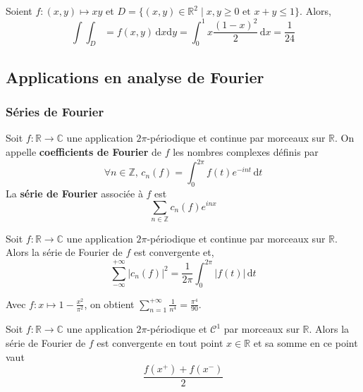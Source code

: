 
  \begin{example}
    Soient $f : (x,y) \mapsto xy$ et $D = \{ (x,y) \in \mathbb{R}^2 \mid x, y \geq 0 \text{ et } x + y \leq 1 \}$. Alors,
    \[ \int \int_D = f(x,y) \, \mathrm{d}x \mathrm{d}y = \int_0^1 x \frac{(1-x)^2}{2} \, \mathrm{d}x = \frac{1}{24} \]
  \end{example}

  \subsection{Applications en analyse de Fourier}

  \subsubsection{Séries de Fourier}


  \begin{definition}
    Soit $f : \mathbb{R} \rightarrow \mathbb{C}$ une application $2\pi$-périodique et continue par morceaux sur $\mathbb{R}$. On appelle \textbf{coefficients de Fourier} de $f$ les nombres complexes définis par
    \[ \forall n \in \mathbb{Z}, \, c_n(f) = \int_{0}^{2\pi} f(t) e^{-int} \, \mathrm{d}t \]
    La \textbf{série de Fourier} associée à $f$ est
    \[ \sum_{n \in \mathbb{Z}} c_n(f)e^{inx} \]
  \end{definition}

  \begin{theorem}[Parseval]
    Soit $f : \mathbb{R} \rightarrow \mathbb{C}$ une application $2\pi$-périodique et continue par morceaux sur $\mathbb{R}$. Alors la série de Fourier de $f$ est convergente et,
    \[ \sum_{-\infty}^{+\infty} |c_n(f)|^2 = \frac{1}{2\pi} \int_0^{2\pi} |f(t)| \, \mathrm{d}t \]
  \end{theorem}

  \begin{example}
    Avec $f : x \mapsto 1 - \frac{x^2}{\pi^2}$, on obtient $\sum_{n=1}^{+\infty} \frac{1}{n^4} = \frac{\pi^4}{90}$.
  \end{example}

  \begin{theorem}
    Soit $f : \mathbb{R} \rightarrow \mathbb{C}$ une application $2\pi$-périodique et $\mathcal{C}^1$ par morceaux sur $\mathbb{R}$. Alors la série de Fourier de $f$ est convergente en tout point $x \in \mathbb{R}$ et sa somme en ce point vaut
    \[ \frac{f(x^+) + f(x^-)}{2} \]
  \end{theorem}

